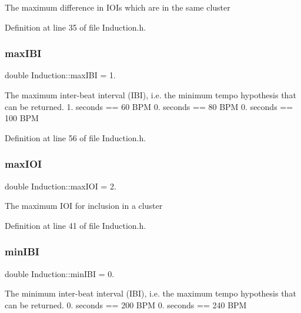 The maximum difference in I\+O\+Is which are in the same cluster 

Definition at line 35 of file Induction.\+h.

\mbox{\label{class_induction_a4f369d04b9ef6a70b1da601489d8b859}} 
\subsubsection{\texorpdfstring{max\+I\+BI}{maxIBI}}
{\footnotesize\ttfamily double Induction\+::max\+I\+BI = 1.\hspace{0.3cm}{\ttfamily [static]}}

The maximum inter-\/beat interval (I\+BI), i.\+e. the minimum tempo hypothesis that can be returned. 1. seconds == 60 B\+PM 0. seconds == 80 B\+PM 0. seconds == 100 B\+PM 

Definition at line 56 of file Induction.\+h.

\mbox{\label{class_induction_ab279072ddf4b9340c14a90622513f52a}} 
\subsubsection{\texorpdfstring{max\+I\+OI}{maxIOI}}
{\footnotesize\ttfamily double Induction\+::max\+I\+OI = 2.\hspace{0.3cm}{\ttfamily [static]}}

The maximum I\+OI for inclusion in a cluster 

Definition at line 41 of file Induction.\+h.

\mbox{\label{class_induction_ae8c5b515b4df99e1c1003f42f9f5c13a}} 
\subsubsection{\texorpdfstring{min\+I\+BI}{minIBI}}
{\footnotesize\ttfamily double Induction\+::min\+I\+BI = 0.\hspace{0.3cm}{\ttfamily [static]}}

The minimum inter-\/beat interval (I\+BI), i.\+e. the maximum tempo hypothesis that can be returned. 0. seconds == 200 B\+PM 0. seconds == 240 B\+PM 

